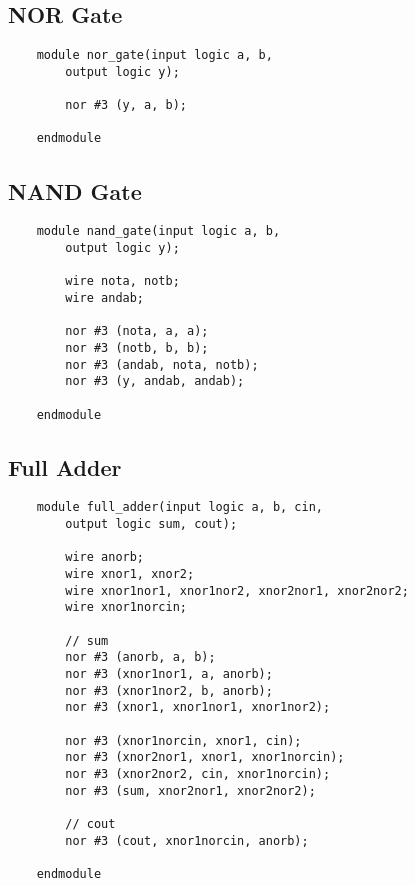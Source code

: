 \documentclass[../main]{subfiles}
\begin{document}
\subsection {NOR Gate}

\begin{verbatim}
    module nor_gate(input logic a, b,
        output logic y);

        nor #3 (y, a, b);

    endmodule
\end{verbatim}

\subsection {NAND Gate}

\begin{verbatim}
    module nand_gate(input logic a, b,
        output logic y);

        wire nota, notb;
        wire andab;

        nor #3 (nota, a, a);
        nor #3 (notb, b, b);
        nor #3 (andab, nota, notb);
        nor #3 (y, andab, andab);

    endmodule

\end{verbatim}

\subsection {Full Adder}

\begin{verbatim}
    module full_adder(input logic a, b, cin,
        output logic sum, cout);

        wire anorb;
        wire xnor1, xnor2;
        wire xnor1nor1, xnor1nor2, xnor2nor1, xnor2nor2;
        wire xnor1norcin;

        // sum
        nor #3 (anorb, a, b);
        nor #3 (xnor1nor1, a, anorb);
        nor #3 (xnor1nor2, b, anorb);
        nor #3 (xnor1, xnor1nor1, xnor1nor2);

        nor #3 (xnor1norcin, xnor1, cin);
        nor #3 (xnor2nor1, xnor1, xnor1norcin);
        nor #3 (xnor2nor2, cin, xnor1norcin);
        nor #3 (sum, xnor2nor1, xnor2nor2);

        // cout
        nor #3 (cout, xnor1norcin, anorb);

    endmodule
\end{verbatim}
\end{document}
